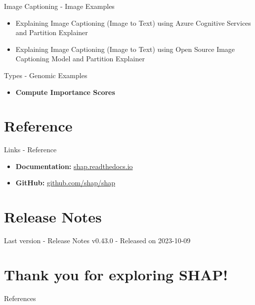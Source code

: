 \documentclass[aspectratio=169]{beamer}
\begin{document}
\begin{frame}{Image Captioning - Image Examples}
    \begin{itemize}
        \item Explaining Image Captioning (Image to Text) using Azure Cognitive Services and Partition Explainer
        \item Explaining Image Captioning (Image to Text) using Open Source Image Captioning Model and Partition Explainer
    \end{itemize}
\end{frame}

\begin{frame}{Types - Genomic Examples}
    \begin{itemize}
        \item \textbf{Compute Importance Scores}
    \end{itemize}
\end{frame}


\section{Reference}

\begin{frame}{Links - Reference}
    \begin{itemize}
        \item \textbf{Documentation:} \url{shap.readthedocs.io}
        \item \textbf{GitHub:} \url{github.com/shap/shap}
    \end{itemize}
    
\end{frame}

\section{Release Notes}

\begin{frame}{Last version - Release Notes}
    v0.43.0 - Released on 2023-10-09
\end{frame}

\section{Thank you for exploring \ac{SHAP}!}


\maketitle

\begin{frame}[allowframebreaks]{References}


\end{frame}
\end{document}

